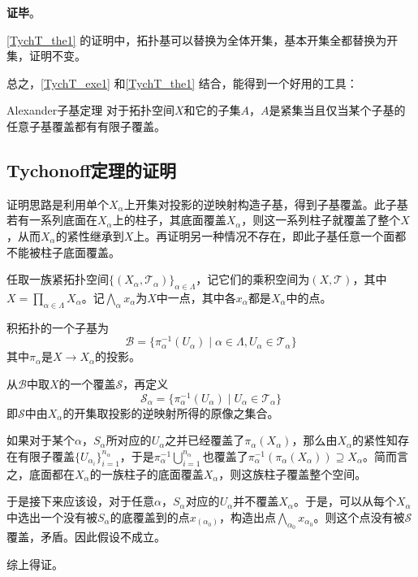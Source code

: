 \textbf{证毕}。



\autoref{TychT_the1} 的证明中，拓扑基可以替换为全体开集，基本开集全都替换为开集，证明不变。

总之，\autoref{TychT_exe1} 和\autoref{TychT_the1} 结合，能得到一个好用的工具：

\begin{corollary}{Alexander子基定理}
对于拓扑空间$X$和它的子集$A$，$A$是紧集当且仅当某个子基的任意子基覆盖都有有限子覆盖。
\end{corollary}




\subsection{Tychonoff定理的证明}

证明思路是利用单个$X_\alpha$上开集对投影的逆映射构造子基，得到子基覆盖。此子基若有一系列底面在$X_\alpha$上的柱子，其底面覆盖$X_\alpha$，则这一系列柱子就覆盖了整个$X$，从而$X_\alpha$的紧性继承到$X$上。再证明另一种情况不存在，即此子基任意一个面都不能被柱子底面覆盖。

任取一族紧拓扑空间$\{(X_\alpha, \mathcal{T}_\alpha)\}_{\alpha\in \Lambda}$，记它们的乘积空间为$(X, \mathcal{T})$，其中$X=\prod_{\alpha\in\Lambda}X_\alpha$。记$\bigwedge_\alpha x_\alpha$为$X$中一点，其中各$x_\alpha$都是$X_\alpha$中的点。

积拓扑的一个子基为
\begin{equation}
\mathcal{B} = \{\pi_\alpha^{-1}(U_\alpha)\mid \alpha\in\Lambda, U_\alpha\in \mathcal{T}_\alpha\}
\end{equation}
其中$\pi_\alpha$是$X\to X_\alpha$的投影。

从$\mathcal{B}$中取$X$的一个覆盖$\mathcal{S}$，再定义
\begin{equation}
\mathcal{S}_\alpha = \{\pi_\alpha^{-1}(U_\alpha)\mid U_\alpha\in \mathcal{T}_\alpha\}
\end{equation}
即$\mathcal{S}$中由$X_\alpha$的开集取投影的逆映射所得的原像之集合。

如果对于某个$\alpha$，$S_\alpha$所对应的$U_\alpha$之并已经覆盖了$\pi_\alpha(X_\alpha)$，那么由$X_\alpha$的紧性知存在有限子覆盖$\{U_{\alpha_i}\}_{i=1}^{n_\alpha}$，于是$\pi_\alpha^{-1}\bigcup_{i=1}^{n_\alpha}$也覆盖了$\pi_\alpha^{-1}(\pi_\alpha(X_\alpha))\supseteq X_\alpha$。简而言之，底面都在$X_\alpha$的一族柱子的底面覆盖$X_\alpha$，则这族柱子覆盖整个空间。

于是接下来应该设，对于任意$\alpha$，$S_\alpha$对应的$U_\alpha$并不覆盖$X_\alpha$。于是，可以从每个$X_\alpha$中选出一个没有被$S_\alpha$的底覆盖到的点$x_(\alpha_0)$，构造出点$\bigwedge_{\alpha_0}x_{\alpha_0}$。则这个点没有被$\mathcal{S}$覆盖，矛盾。因此假设不成立。

综上得证。

















